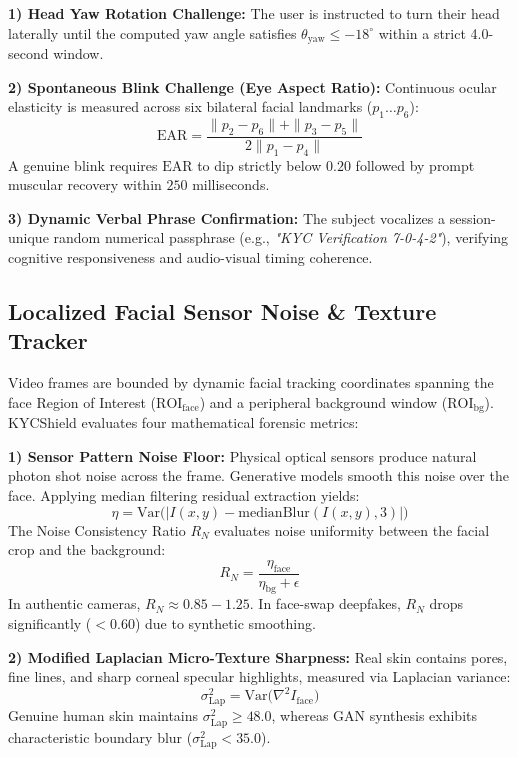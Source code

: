 \documentclass[conference]{IEEEtran}
\begin{document}
\textbf{1) Head Yaw Rotation Challenge:} The user is instructed to turn their head laterally until the computed yaw angle satisfies $\theta_{\text{yaw}} \le -18^\circ$ within a strict 4.0-second window.

\textbf{2) Spontaneous Blink Challenge (Eye Aspect Ratio):} Continuous ocular elasticity is measured across six bilateral facial landmarks ($p_1 \dots p_6$):
\begin{equation}
\text{EAR} = \frac{\|p_2 - p_6\| + \|p_3 - p_5\|}{2 \|p_1 - p_4\|}
\end{equation}
A genuine blink requires $\text{EAR}$ to dip strictly below $0.20$ followed by prompt muscular recovery within $250$ milliseconds.

\textbf{3) Dynamic Verbal Phrase Confirmation:} The subject vocalizes a session-unique random numerical passphrase (e.g., \textit{"KYC Verification 7-0-4-2"}), verifying cognitive responsiveness and audio-visual timing coherence.

\subsection{Localized Facial Sensor Noise \& Texture Tracker}
Video frames are bounded by dynamic facial tracking coordinates spanning the face Region of Interest ($\text{ROI}_{\text{face}}$) and a peripheral background window ($\text{ROI}_{\text{bg}}$). KYCShield evaluates four mathematical forensic metrics:

\textbf{1) Sensor Pattern Noise Floor:} Physical optical sensors produce natural photon shot noise across the frame. Generative models smooth this noise over the face. Applying median filtering residual extraction yields:
\begin{equation}
\eta = \text{Var}\big(|I(x, y) - \text{medianBlur}(I(x, y), 3)|\big)
\end{equation}
The Noise Consistency Ratio $R_N$ evaluates noise uniformity between the facial crop and the background:
\begin{equation}
R_N = \frac{\eta_{\text{face}}}{\eta_{\text{bg}} + \epsilon}
\end{equation}
In authentic cameras, $R_N \approx 0.85 - 1.25$. In face-swap deepfakes, $R_N$ drops significantly ($< 0.60$) due to synthetic smoothing.

\textbf{2) Modified Laplacian Micro-Texture Sharpness:} Real skin contains pores, fine lines, and sharp corneal specular highlights, measured via Laplacian variance:
\begin{equation}
\sigma^2_{\text{Lap}} = \text{Var}\big(\nabla^2 I_{\text{face}}\big)
\end{equation}
Genuine human skin maintains $\sigma^2_{\text{Lap}} \ge 48.0$, whereas GAN synthesis exhibits characteristic boundary blur ($\sigma^2_{\text{Lap}} < 35.0$).
\end{document}
